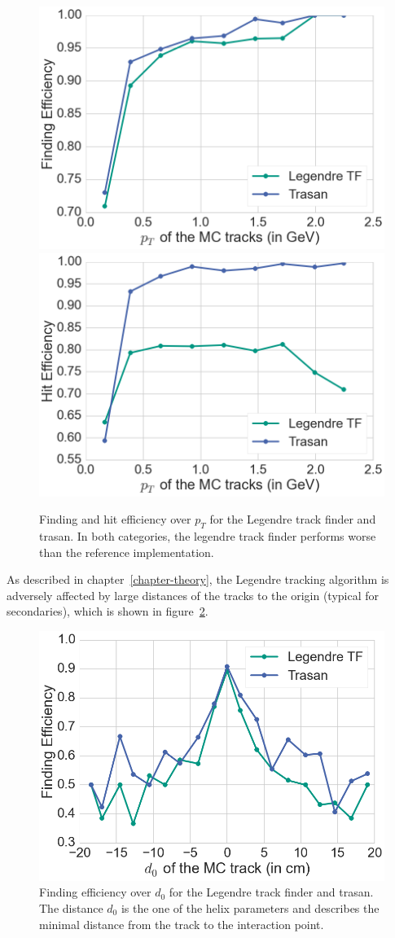 \begin{figure}
  \centering
  \includegraphics[width=0.48\linewidth]{figures/workflow/legendre_pt.png}
  \includegraphics[width=0.48\linewidth]{figures/workflow/legendre_hit.png}
  \caption{Finding and hit efficiency over $p_T$ for the Legendre track finder and trasan. In both categories, the legendre track finder performs worse than the reference implementation.}
  \label{fig-legendre-finding-efficiency}
\end{figure}

As described in chapter~\ref{chapter-theory}, the Legendre tracking algorithm is adversely affected by large distances of the tracks to the origin (typical for secondaries), which is shown in figure~\ref{fig-legendre-d0}.

\begin{figure}
  \centering
  \includegraphics[width=0.7\linewidth]{figures/workflow/legendre_d0.png}
  \caption{Finding efficiency over $d_0$ for the Legendre track finder and trasan. The distance $d_0$ is the one of the helix parameters and describes the minimal distance from the track to the interaction point.}
  \label{fig-legendre-d0}
\end{figure}


